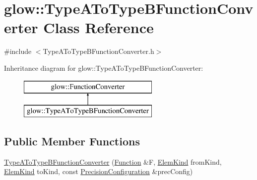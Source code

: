 \hypertarget{classglow_1_1_type_a_to_type_b_function_converter}{}\section{glow\+:\+:Type\+A\+To\+Type\+B\+Function\+Converter Class Reference}
\label{classglow_1_1_type_a_to_type_b_function_converter}


{\ttfamily \#include $<$Type\+A\+To\+Type\+B\+Function\+Converter.\+h$>$}

Inheritance diagram for glow\+:\+:Type\+A\+To\+Type\+B\+Function\+Converter\+:\begin{figure}[H]
\begin{center}
\leavevmode
\includegraphics[height=2.000000cm]{classglow_1_1_type_a_to_type_b_function_converter}
\end{center}
\end{figure}
\subsection*{Public Member Functions}
\begin{DoxyCompactItemize}
\item 
\hyperlink{classglow_1_1_type_a_to_type_b_function_converter_a6d7a78b265dde722fddb1372deb6d9bd}{Type\+A\+To\+Type\+B\+Function\+Converter} (\hyperlink{classglow_1_1_function}{Function} \&F, \hyperlink{namespaceglow_ab92e14a94329daf4083db670e95fbcdf}{Elem\+Kind} from\+Kind, \hyperlink{namespaceglow_ab92e14a94329daf4083db670e95fbcdf}{Elem\+Kind} to\+Kind, const \hyperlink{structglow_1_1_precision_configuration}{Precision\+Configuration} \&prec\+Config)
\end{DoxyCompactItemize}
